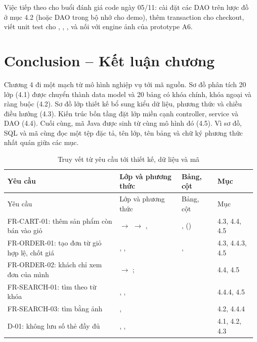 \documentclass[12pt,a4paper]{article}
\begin{document}
Việc tiếp theo cho buổi đánh giá code ngày 05/11: cài đặt các DAO trên lược đồ ở mục 4.2 (hoặc DAO
trong bộ nhớ cho demo), thêm transaction cho checkout, viết unit test cho , ,
, và nối  với engine ảnh của prototype A6.

\section{Conclusion -- Kết luận chương}\label{sec:46}

Chương 4 đi một mạch từ mô hình nghiệp vụ tới mã nguồn. Sơ đồ phân tích 20 lớp (4.1) được chuyển thành
data model và 20 bảng có khóa chính, khóa ngoại và ràng buộc (4.2). Sơ đồ lớp thiết kế bổ sung kiểu dữ
liệu, phương thức và chiều điều hướng (4.3). Kiến trúc bốn tầng đặt lớp miền cạnh controller, service và
DAO (4.4). Cuối cùng, mã Java được sinh từ cùng mô hình đó (4.5). Vì sơ đồ, SQL và mã cùng đọc một tệp
đặc tả, tên lớp, tên bảng và chữ ký phương thức nhất quán giữa các mục.

\begin{longtable}{@{}P{2.9cm}P{6.3cm}P{3.5cm}P{2.8cm}@{}}
\caption{Truy vết từ yêu cầu tới thiết kế, dữ liệu và mã}\label{tab:trace}\\
\toprule
Yêu cầu & Lớp và phương thức & Bảng, cột & Mục\\
\midrule
\endfirsthead
\toprule
Yêu cầu & Lớp và phương thức & Bảng, cột & Mục\\
\midrule
\endhead
\small FR-CART-01: thêm sản phẩm còn bán vào giỏ & \small{} $\to$  $\to$ ,  & \small{},  () & \small 4.3, 4.4, 4.5\\
\small FR-ORDER-01: tạo đơn từ giỏ hợp lệ, chốt giá & \small{}, ,  & \small{},  & \small 4.3, 4.4.3, 4.5\\
\small FR-ORDER-02: khách chỉ xem đơn của mình & \small{} $\to$ ;  & \small{} & \small 4.4, 4.5\\
\small FR-SEARCH-01: tìm theo từ khóa & \small{}, ,  & \small{} & \small 4.4.4, 4.5\\
\small FR-SEARCH-03: tìm bằng ảnh & \small{},  & \small{} & \small 4.2, 4.4.4\\
\small D-01: không lưu số thẻ đầy đủ & \small{}, ,  & \small{} & \small 4.1, 4.2, 4.3\\
\bottomrule
\end{longtable}
\end{document}
